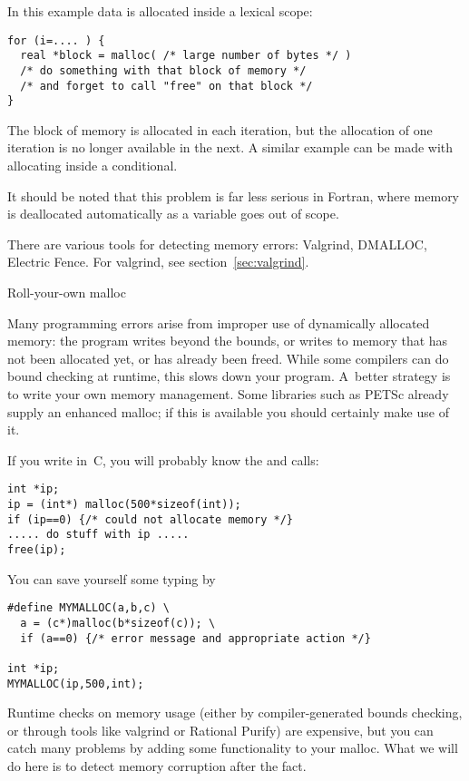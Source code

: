 In this example data is allocated inside a lexical scope:
\begin{verbatim}
for (i=.... ) {
  real *block = malloc( /* large number of bytes */ )
  /* do something with that block of memory */
  /* and forget to call "free" on that block */
}
\end{verbatim}
The block of memory is allocated in each iteration, but the allocation
of one iteration is no longer available in the next. A similar example
can be made with allocating inside a conditional. 

It should be noted
that this problem is far less serious in Fortran, where memory is
deallocated automatically as a variable goes out of scope.

There are various tools for detecting memory errors: Valgrind,
DMALLOC, Electric Fence. For valgrind, see section~\ref{sec:valgrind}.

 {Roll-your-own malloc}

Many programming errors arise from improper use of dynamically
allocated memory: the program writes beyond the bounds, or writes to
memory that has not been allocated yet, or has already been
freed. While some compilers can do bound checking at runtime, this
slows down your program. A~better strategy is to write your own memory
management. Some libraries such as PETSc already supply an enhanced
malloc; if this is available you should certainly make use of it.

If you write in~C, you will probably know the  and  calls:
\begin{verbatim}
int *ip;
ip = (int*) malloc(500*sizeof(int));
if (ip==0) {/* could not allocate memory */}
..... do stuff with ip .....
free(ip);
\end{verbatim}
You can save yourself some typing by
\begin{verbatim}
#define MYMALLOC(a,b,c) \
  a = (c*)malloc(b*sizeof(c)); \
  if (a==0) {/* error message and appropriate action */}

int *ip;
MYMALLOC(ip,500,int);
\end{verbatim}

Runtime checks on memory usage (either by compiler-generated bounds
checking, or through tools like
valgrind or Rational Purify) are expensive, but you can catch many
problems by adding some functionality to your malloc.
What we will do here is to detect memory corruption
after the fact. 

